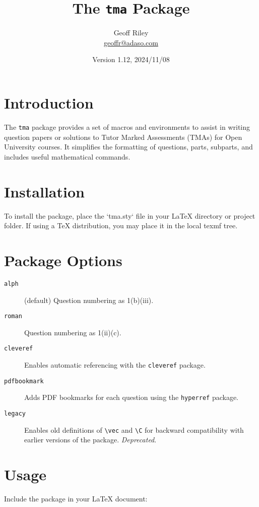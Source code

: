 \documentclass[twoside]{article}
\title{The \texttt{tma} Package}
\author{Geoff Riley \\ \href{mailto:geoffr@adaso.com.com}{geoffr@adaso.com}}
\date{Version 1.12, 2024/11/08}
\begin{document}
	
	\maketitle
	
	\tableofcontents
	
	\section{Introduction}
	
	The \texttt{tma} package provides a set of macros and environments to assist in writing question papers or solutions to Tutor Marked Assessments (TMAs) for Open University courses. It simplifies the formatting of questions, parts, subparts, and includes useful mathematical commands.
	
	\section{Installation}
	
	To install the package, place the `tma.sty` file in your LaTeX directory or project folder. If using a TeX distribution, you may place it in the local texmf tree.
	
	\section{Package Options}
	
	\begin{description}
		\item[\texttt{alph}] (default) Question numbering as 1(b)(iii).
		\item[\texttt{roman}] Question numbering as 1(ii)(c).
		\item[\texttt{cleveref}] Enables automatic referencing with the \texttt{cleveref} package.
		\item[\texttt{pdfbookmark}] Adds PDF bookmarks for each question using the \texttt{hyperref} package.
		\item[\texttt{legacy}] Enables old definitions of \verb|\vec| and \verb|\C| for backward compatibility with earlier versions of the package. \emph{Deprecated}.
	\end{description}
	
	\section{Usage}
	
	Include the package in your LaTeX document:
	
\end{document}
